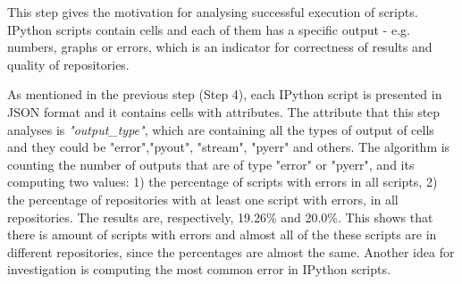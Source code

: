 This step gives the motivation for analysing successful execution of scripts. IPython scripts contain cells and each of them has a specific output - e.g. numbers, graphs or errors, which is an indicator for correctness of results and quality of repositories. 

As mentioned in the previous step (Step 4), each IPython script is presented in JSON format and it contains cells with attributes. The attribute that this step analyses is \textit{"output\_type"}, which are containing all the types of output of cells and they could be "error","pyout", "stream", "pyerr" and others. The algorithm is counting the number of outputs that are of type "error" or "pyerr", and its computing two values: 1) the percentage of scripts with errors in all scripts, 2) the percentage of repositories with at least one script with errors, in all repositories. The results are, respectively, 19.26\% and 20.0\%. This shows that there is amount of scripts with errors and almost all of the these scripts are in different repositories, since the percentages are almost the same. Another idea for investigation is computing the most common error in IPython scripts.

